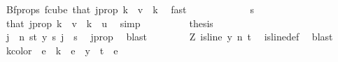 \begin{isabellebody}
\ Bf{\isacharunderscore}{\kern0pt}props{\isacharparenleft}{\kern0pt}{}{\isacharparenright}{\kern0pt}\ f{\isacharunderscore}{\kern0pt}cube\ that\ j{\isacharunderscore}{\kern0pt}prop\ {\isacartoucheopen}k\ {\isacharminus}{\kern0pt}\ v\ {\isacharless}{\kern0pt}\ k{\isacartoucheclose}\ \isamarkupfalse%
\ fast\isanewline
\ \ \ \ \ \ \isamarkupfalse%
\ \isamarkupfalse%
\ {\isachardoublequoteopen}\ {\isachardot}{\kern0pt}{\isachardot}{\kern0pt}{\isachardot}{\kern0pt}\ {\isacharequal}{\kern0pt}\ s{\isachardoublequoteclose}\ \isamarkupfalse%
\ that\ j{\isacharunderscore}{\kern0pt}prop\ {\isacartoucheopen}k\ {\isacharminus}{\kern0pt}\ v\ {\isacharless}{\kern0pt}\ k\ {\isacharminus}{\kern0pt}\ u{\isacartoucheclose}\ \isamarkupfalse%
\ simp\isanewline
\ \ \ \ \ \ \isamarkupfalse%
\ \isamarkupfalse%
\ {\isacharquery}{\kern0pt}thesis\ \isacommand{{\isachardot}{\kern0pt}}\isamarkupfalse%
\isanewline
\ \ \ \ \isamarkupfalse%
\isanewline
\ \ \ \ \isamarkupfalse%
\ \isamarkupfalse%
\ {\isachardoublequoteopen}{\isasymexists}j\ {\isacharless}{\kern0pt}\ n{\isachardot}{\kern0pt}\ {\isasymforall}s{\isacharless}{\kern0pt}t{\isacharplus}{\kern0pt}{}{\isachardot}{\kern0pt}\ y\ s\ j\ {\isacharequal}{\kern0pt}\ s{\isachardoublequoteclose}\ \isamarkupfalse%
\ j{\isacharunderscore}{\kern0pt}prop\ \isamarkupfalse%
\ blast\isanewline
\ \ \isamarkupfalse%
\isanewline
\ \ \isamarkupfalse%
\ \isamarkupfalse%
\ Z{}{\isacharcolon}{\kern0pt}\ {\isachardoublequoteopen}is{\isacharunderscore}{\kern0pt}line\ y\ n\ {\isacharparenleft}{\kern0pt}t{\isacharplus}{\kern0pt}{}{\isacharparenright}{\kern0pt}{\isachardoublequoteclose}\ \isamarkupfalse%
\ is{\isacharunderscore}{\kern0pt}line{\isacharunderscore}{\kern0pt}def\ \isamarkupfalse%
\ blast\isanewline
\isanewline
\ \ \isamarkupfalse%
\ k{\isacharunderscore}{\kern0pt}color{\isacharcolon}{\kern0pt}\ {\isachardoublequoteopen}{\isasymchi}\ e\ {\isacharless}{\kern0pt}\ k{\isachardoublequoteclose}\ \ {\isachardoublequoteopen}e\ {\isasymin}\ y\ {\isacharbackquote}{\kern0pt}\ {\isacharbraceleft}{\kern0pt}{\isachardot}{\kern0pt}{\isachardot}{\kern0pt}{\isacharless}{\kern0pt}t{\isacharplus}{\kern0pt}{}{\isacharbraceright}{\kern0pt}{\isachardoublequoteclose}\ \ e\ \isamarkupfalse%

\end{isabellebody}
